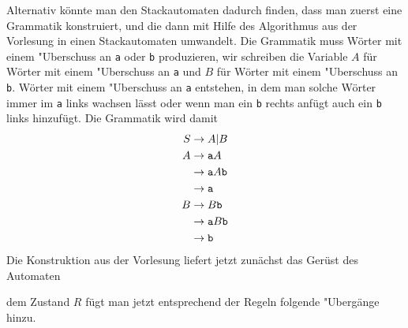 \begin{loesung}
Alternativ könnte man den Stackautomaten dadurch finden, dass man
zuerst eine Grammatik konstruiert, und die dann mit Hilfe des Algorithmus
aus der Vorlesung in einen Stackautomaten umwandelt. Die Grammatik
muss Wörter mit einem "Uberschuss an {\tt a} oder {\tt b}
produzieren, wir schreiben die Variable $A$ für Wörter mit einem
"Uberschuss an {\tt a} und $B$ für Wörter mit einem "Uberschuss an
{\tt b}. Wörter mit einem "Uberschuss an {\tt a} entstehen, in dem man
solche Wörter immer im {\tt a} links wachsen lässt oder wenn man
ein {\tt b} rechts anfügt auch ein {\tt b} links hinzufügt. Die Grammatik
wird damit
\begin{align*}
S&\to A|B\\
A&\to {\tt a}A\\
 &\to {\tt a}A{\tt b}\\
 &\to {\tt a}\\
B&\to B{\tt b}\\
 &\to {\tt a}B{\tt b}\\
 &\to {\tt b}\\
\end{align*}
Die Konstruktion aus der Vorlesung liefert jetzt zunächst das
Gerüst des Automaten
\begin{center}
\end{center}
dem Zustand $R$ fügt man jetzt entsprechend der Regeln folgende
"Ubergänge hinzu.

\end{loesung}
